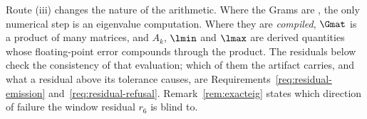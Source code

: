 
Route (iii) changes the nature of the arithmetic. Where the Grams are
, the only numerical step is an eigenvalue computation. Where they are
\emph{compiled}, $\Gmat$ is a product of many matrices, and $A_k$, $\lmin$ and
$\lmax$ are derived quantities whose floating-point error compounds through the
product. The residuals below check the consistency of that evaluation; which of
them the artifact carries, and what a residual above its tolerance causes, are
Requirements~\ref{req:residual-emission} and~\ref{req:residual-refusal}.
Remark~\ref{rem:exacteig} states which direction of failure the window
residual $r_6$ is blind to.

